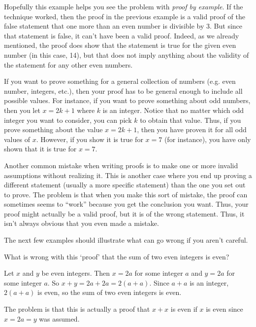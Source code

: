 Hopefully this example helps you see the problem with {\em proof by example}. If the technique worked,
then the proof in the previous example is a valid proof of the false statement that one more than an even number is 
divisible by 3. But since that statement is false, it can't have been a valid proof. Indeed, as we
already mentioned, the proof does show that the statement is true for the given even number (in this case, 14),
but that does not imply anything about the validity of the statement for any other even numbers.

If you want to prove something for a general collection of
numbers (e.g. even number, integers, etc.), then your proof has to be general enough to include all 
possible values. For instance, if you want to prove something about odd numbers, then you let 
$x=2k+1$ where $k$ is an integer. Notice that no matter which odd integer you want to consider, you can
pick $k$ to obtain that value. Thus, if you prove something about the value $x=2k+1$, then
you have proven it for all odd values of $x$. However, if you show it is true for $x=7$ (for instance), you have
only shown that it is true for $x=7$.

Another common mistake when writing proofs is to make one or more invalid assumptions without realizing it. 
This is another case where you end up proving a different statement (usually a more specific statement) 
than the one you set out to prove.
The problem is that when you make this sort of mistake, the proof can sometimes seems to ``work'' 
because you get the conclusion you want. 
Thus, your proof might actually be a valid proof, but it is of the wrong statement.
Thus, it isn't always obvious that you even made a mistake. 

The next few examples should illustrate what can go wrong if you aren't careful.

\begin{ques}
 What is wrong with this `proof' that the sum of two even integers is even?
\begin{spf}
Let $x$ and $y$ be even integers.  Then $x=2a$ for some integer $a$ and $y=2a$
for some integer $a$.
So $x+y=2a+2a=2(a+a)$.  Since $a+a$ is an integer, $2(a+a)$
is even, so the sum of two even integers is even.
\end{spf}
\answerlinetwo
\begin{answer}
The problem is that this is actually a proof that $x+x$ is even if $x$ is even since $x=2a=y$ was assumed.
\end{answer}
\end{ques}

